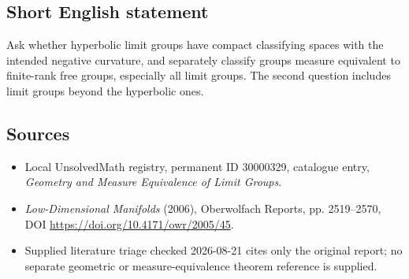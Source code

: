 \documentclass[11pt]{article}
\begin{document}
\subsection{Short English statement}
Ask whether hyperbolic limit groups have compact classifying spaces with the intended negative curvature, and separately classify groups measure equivalent to finite-rank free groups, especially all limit groups. The second question includes limit groups beyond the hyperbolic ones.
\subsection{Sources}
\begin{itemize}
\item Local UnsolvedMath registry, permanent ID 30000329, catalogue entry, \emph{Geometry and Measure Equivalence of Limit Groups}.
\item \emph{Low-Dimensional Manifolds} (2006), Oberwolfach Reports, pp. 2519--2570, DOI \url{https://doi.org/10.4171/owr/2005/45}.
\item Supplied literature triage checked 2026-08-21 cites only the original report; no separate geometric or measure-equivalence theorem reference is supplied.
\end{itemize}
\end{document}
